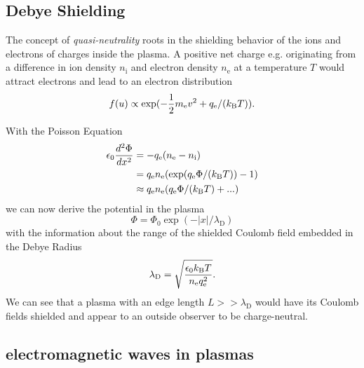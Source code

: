 \subsection*{Debye Shielding}
The concept of \textit{quasi-neutrality} roots in the shielding behavior of the ions and electrons of charges inside the plasma. 
A positive net charge e.g. originating from a difference in ion density $n_\mathrm{i}$ and electron density $n_\mathrm{e}$ at a temperature $T$
would attract electrons and lead to an electron distribution 
\begin{equation}
f(u) \propto \exp(-\frac{1}{2}m_\mathrm{e} v^2+q_\mathrm{e}/( k_\mathrm{B}T)).
\end{equation}

With the Poisson Equation 
\begin{align}
\label{eqn:Poisson_plasma}
\epsilon_0 \frac{d^2\Phi}{dx^2}&=-q_\mathrm{e}(n_\mathrm{e}-n_\mathrm{i})\\
&=q_\mathrm{e} n_\mathrm{e} (\exp(q_\mathrm{e}\Phi/(k_\mathrm{B}T))-1)\\
&\approx q_\mathrm{e}n_\mathrm{e}(q_\mathrm{e}\Phi/(k_\mathrm{B}T)+...)
\end{align}
we can now derive the potential in the plasma
\begin{equation}
\Phi = \Phi_0\exp(-|x|/\lambda_\mathrm{D})
\end{equation}
with the information about the range of the shielded Coulomb field embedded in the Debye Radius
\begin{equation}
\lambda_\mathrm{D}=\sqrt{\frac{\epsilon_0 k_\mathrm{B}T}{n_\mathrm{e}q_\mathrm{e}^2}}.
\end{equation}
We can see that a plasma with an edge length $L>>\lambda_\mathrm{D}$ would have its Coulomb fields shielded and appear to an outside observer to be charge-neutral. 





\subsection{electromagnetic waves in plasmas}

